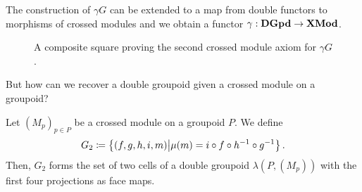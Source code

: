 \begin{defn}
The construction of $\gamma G$ can be extended to a map from double functors to
morphisms of crossed modules and we obtain a functor $\gamma : \mathbf{DGpd} \to \mathbf{XMod}$.
\end{defn}

\begin{figure} \centering
{}
\caption{A composite square proving the second crossed module axiom for $\gamma G$.}
\label{fig:gamma-cm2}
\end{figure}

But how can we recover a double groupoid given a crossed module on a groupoid?

\begin{lemma}
Let $(M_p)_{p \in P}$ be a crossed module on a groupoid $P$. We define
\begin{equation*}
G_2 \coloneqq \left\{ (f,g,h,i,m) \middle| 
	\mu(m) = i \circ f \circ h^{-1} \circ g^{-1} \right\} \text{.}
\end{equation*}
Then, $G_2$ forms the set of two cells of a double groupoid $\lambda (P, (M_p))$
with the first four projections as face maps.
\end{lemma}

